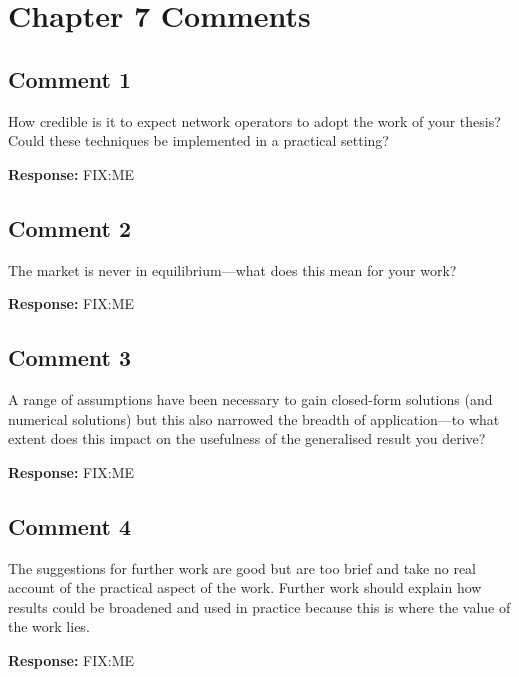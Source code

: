 \documentclass[10pt,a4paper,notitlepage]{article}
\numberwithin{equation}{section}
\begin{document}
\clearpage

\section{Chapter 7 Comments}
\subsection{Comment 1}
How credible is it to expect network operators to adopt the work of your thesis? Could these techniques be implemented in a practical setting?

\textbf{Response:}
FIX:ME

\subsection{Comment 2}
The market is never in equilibrium---what does this mean for your work?

\textbf{Response:}
FIX:ME

\subsection{Comment 3}
A range of assumptions have been necessary to gain closed-form solutions (and numerical solutions) but this also narrowed the breadth of application---to what extent does this impact on the usefulness of the generalised result you derive?

\textbf{Response:}
FIX:ME

\subsection{Comment 4}
The suggestions for further work are good but are too brief and take no real account of the practical aspect of the work. Further work should explain how results could be broadened and used in practice because this is where the value of the work lies.

\textbf{Response:}
FIX:ME
\end{document}
